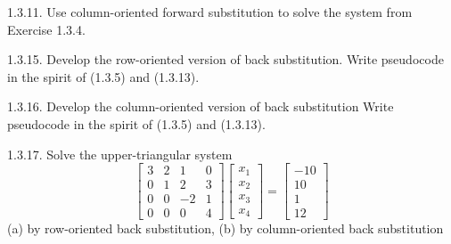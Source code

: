 \documentclass{report}
\begin{document}
    \pagebreak \bigbreak \noindent 
    \begin{mdframed}
        1.3.11. Use column-oriented forward substitution to solve the system from Exercise 1.3.4.
    \end{mdframed}

    \pagebreak \bigbreak \noindent 
    \begin{mdframed}
        1.3.15. Develop the row-oriented version of back substitution. Write pseudocode in the spirit of (1.3.5) and (1.3.13).
    \end{mdframed}

    \pagebreak \bigbreak \noindent 
    \begin{mdframed}
        1.3.16. Develop the column-oriented version of back substitution Write pseudocode in the spirit of (1.3.5) and (1.3.13).
    \end{mdframed}

    \pagebreak \bigbreak \noindent 
    \begin{mdframed}
        1.3.17. Solve the upper-triangular system
        \[
            \begin{bmatrix}
                3 & 2 & 1 & 0 \\
                0 & 1 & 2 & 3 \\
                0 & 0 & -2 & 1 \\
                0 & 0 & 0 & 4
            \end{bmatrix}
            \begin{bmatrix}
                x_{1} \\
                x_{2} \\
                x_{3} \\
                x_{4}
            \end{bmatrix}
            =
            \begin{bmatrix}
                -10 \\
                10 \\
                1 \\
                12
            \end{bmatrix}
        \]
        (a) by row-oriented back substitution, (b) by column-oriented back substitution
    \end{mdframed}
\end{document}
